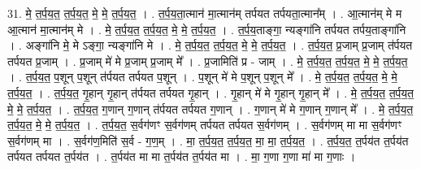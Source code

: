 \documentclass[17pt]{extarticle}
\begin{document}
31. मे॒ त॒र्प॒य॒त॒ त॒र्प॒य॒त॒ मे॒ मे॒ त॒र्प॒य॒त॒ । . त॒र्प॒य॒ता॒त्मान॑ मा॒त्मान॑म् तर्पयत तर्पयता॒त्मान᳚म् । . आ॒त्मान॑म् मे म आ॒त्मान॑ मा॒त्मान॑म् मे । . मे॒ त॒र्प॒य॒त॒ त॒र्प॒य॒त॒ मे॒ मे॒ त॒र्प॒य॒त॒ । . त॒र्प॒य॒ताङ्गा॒ न्यङ्गा॑नि तर्पयत तर्पय॒ताङ्गा॑नि । . अङ्गा॑नि मे॒ मे ऽङ्गा॒ न्यङ्गा॑नि मे । . मे॒ त॒र्प॒य॒त॒ त॒र्प॒य॒त॒ मे॒ मे॒ त॒र्प॒य॒त॒ । . त॒र्प॒य॒त॒ प्र॒जाम् प्र॒जाम् त॑र्पयत तर्पयत प्र॒जाम् । . प्र॒जाम् मे॑ मे प्र॒जाम् प्र॒जाम् मे᳚ । . प्र॒जामिति॑ प्र - जाम् । . मे॒ त॒र्प॒य॒त॒ त॒र्प॒य॒त॒ मे॒ मे॒ त॒र्प॒य॒त॒ । . त॒र्प॒य॒त॒ प॒शून् प॒शून् त॑र्पयत तर्पयत प॒शून् । . प॒शून् मे॑ मे प॒शून् प॒शून् मे᳚ । . मे॒ त॒र्प॒य॒त॒ त॒र्प॒य॒त॒ मे॒ मे॒ त॒र्प॒य॒त॒ । . त॒र्प॒य॒त॒ गृ॒हान् गृ॒हान् त॑र्पयत तर्पयत गृ॒हान् । . गृ॒हान् मे॑ मे गृ॒हान् गृ॒हान् मे᳚ । . मे॒ त॒र्प॒य॒त॒ त॒र्प॒य॒त॒ मे॒ मे॒ त॒र्प॒य॒त॒ । . त॒र्प॒य॒त॒ ग॒णान् ग॒णान् त॑र्पयत तर्पयत ग॒णान् । . ग॒णान् मे॑ मे ग॒णान् ग॒णान् मे᳚ । . मे॒ त॒र्प॒य॒त॒ त॒र्प॒य॒त॒ मे॒ मे॒ त॒र्प॒य॒त॒ । . त॒र्प॒य॒त॒ स॒र्वग॑णꣳ स॒र्वग॑णम् तर्पयत तर्पयत स॒र्वग॑णम् । . स॒र्वग॑णम् मा मा स॒र्वग॑णꣳ स॒र्वग॑णम् मा । . स॒र्वग॑ण॒मिति॑ स॒र्व - ग॒ण॒म् । . मा॒ त॒र्प॒य॒त॒ त॒र्प॒य॒त॒ मा॒ मा॒ त॒र्प॒य॒त॒ । . त॒र्प॒य॒त॒ त॒र्पय॑त त॒र्पय॑त तर्पयत तर्पयत त॒र्पय॑त । . त॒र्पय॑त मा मा त॒र्पय॑त त॒र्पय॑त मा । . मा॒ ग॒णा ग॒णा मा॑ मा ग॒णाः । \newline
\pagebreak
{}
\end{document}
